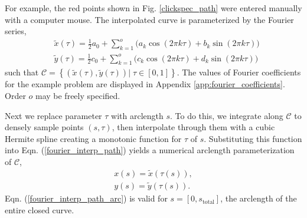 \documentclass[journal]{IEEEtran}
\begin{document}
For example, the red points shown in Fig. \ref{clickspec_path} were entered manually with a computer mouse.  The interpolated curve is parameterized by the Fourier series,
\begin{align}
&\tilde{x}(\tau) = \tfrac{1}{2}a_0 + \textstyle\sum\limits_{k=1}^{o}\!\Big( a_k\cos (2\pi k\tau) + b_k\sin (2\pi k\tau) \Big) \nonumber\\[5pt]
&\tilde{y}(\tau) = \tfrac{1}{2}c_0 + \textstyle\sum\limits_{k=1}^{o}\!\Big( c_k\cos (2\pi k\tau) + d_k\sin (2\pi k\tau) \Big)
\label{fourier_interp_path}
\end{align}
such that $\mathcal{C} = \left\lbrace \left( \tilde{x}(\tau), \tilde{y}(\tau) \right) |\; \tau \in [0,1] \right\rbrace$.
The values of Fourier coefficients for the example problem are displayed in Appendix \ref{app:fourier_coefficients}.
Order $o$ may be freely specified.


Next we replace parameter $\tau$ with arclength $s$.
To do this, we integrate along $\mathcal{C}$ to densely sample points $(s, \tau)$, then interpolate through them with a cubic Hermite spline creating a monotonic function for $\tau$ of $s$.  Substituting this function into Eqn. (\ref{fourier_interp_path}) yields a numerical arclength parameterization of $\mathcal{C}$,
\begin{align}
x(s) = \tilde{x}(\tau(s)), \nonumber\\
y(s) = \tilde{y}(\tau(s)).
\label{fourier_interp_path_arc}
\end{align}
Eqn. (\ref{fourier_interp_path_arc}) is valid for $s=[0,s_\text{total}]$, the arclength of the entire closed curve.
\end{document}
